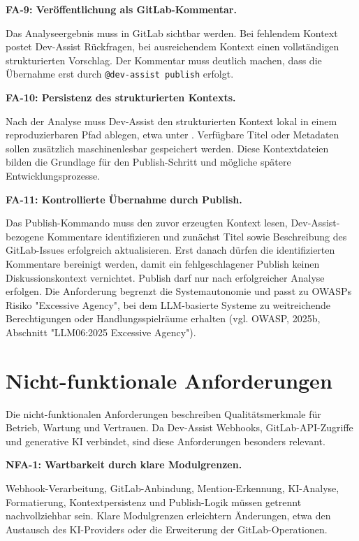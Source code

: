 \documentclass[12pt,a4paper,oneside]{scrreprt}
\begin{document}
\textbf{FA-9: Veröffentlichung als GitLab-Kommentar.}

Das Analyseergebnis muss in GitLab sichtbar werden. Bei fehlendem Kontext postet Dev-Assist Rückfragen, bei ausreichendem Kontext einen vollständigen strukturierten Vorschlag. Der Kommentar muss deutlich machen, dass die Übernahme erst durch \texttt{@dev-assist publish} erfolgt.

\textbf{FA-10: Persistenz des strukturierten Kontexts.}

Nach der Analyse muss Dev-Assist den strukturierten Kontext lokal in einem reproduzierbaren Pfad ablegen, etwa unter . Verfügbare Titel oder Metadaten sollen zusätzlich maschinenlesbar gespeichert werden. Diese Kontextdateien bilden die Grundlage für den Publish-Schritt und mögliche spätere Entwicklungsprozesse.

\textbf{FA-11: Kontrollierte Übernahme durch Publish.}

Das Publish-Kommando muss den zuvor erzeugten Kontext lesen, Dev-Assist-bezogene Kommentare identifizieren und zunächst Titel sowie Beschreibung des GitLab-Issues erfolgreich aktualisieren. Erst danach dürfen die identifizierten Kommentare bereinigt werden, damit ein fehlgeschlagener Publish keinen Diskussionskontext vernichtet. Publish darf nur nach erfolgreicher Analyse erfolgen. Die Anforderung begrenzt die Systemautonomie und passt zu OWASPs Risiko "Excessive Agency", bei dem LLM-basierte Systeme zu weitreichende Berechtigungen oder Handlungsspielräume erhalten (vgl. OWASP, 2025b, Abschnitt "LLM06:2025 Excessive Agency").

\section{Nicht-funktionale Anforderungen}

Die nicht-funktionalen Anforderungen beschreiben Qualitätsmerkmale für Betrieb, Wartung und Vertrauen. Da Dev-Assist Webhooks, GitLab-API-Zugriffe und generative KI verbindet, sind diese Anforderungen besonders relevant.

\textbf{NFA-1: Wartbarkeit durch klare Modulgrenzen.}

Webhook-Verarbeitung, GitLab-Anbindung, Mention-Erkennung, KI-Analyse, Formatierung, Kontextpersistenz und Publish-Logik müssen getrennt nachvollziehbar sein. Klare Modulgrenzen erleichtern Änderungen, etwa den Austausch des KI-Providers oder die Erweiterung der GitLab-Operationen.
\end{document}

